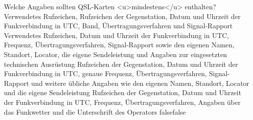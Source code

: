     {Welche Angaben sollten QSL-Karten <u>mindestens</u> enthalten?}
    {Verwendetes Rufzeichen, Rufzeichen der Gegenstation, Datum und Uhrzeit der Funkverbindung in UTC, Band, Übertragungsverfahren und Signal-Rapport}
    {Verwendetes Rufzeichen, Datum und Uhrzeit der Funkverbindung in UTC, Frequenz, Übertragungsverfahren, Signal-Rapport sowie den eigenen Namen, Standort, Locator, die eigene Sendeleistung und Angaben zur eingesetzten technischen Ausrüstung}
    {Rufzeichen der Gegenstation, Datum und Uhrzeit der Funkverbindung in UTC, genaue Frequenz, Übertragungsverfahren, Signal-Rapport und weitere übliche Angaben wie den eigenen Namen, Standort, Locator und die eigene Sendeleistung}
    {Rufzeichen der Gegenstation, Datum und Uhrzeit der Funkverbindung in UTC, Frequenz, Übertragungsverfahren, Angaben über das Funkwetter und die Unterschrift des Operators}
    {false}{false}